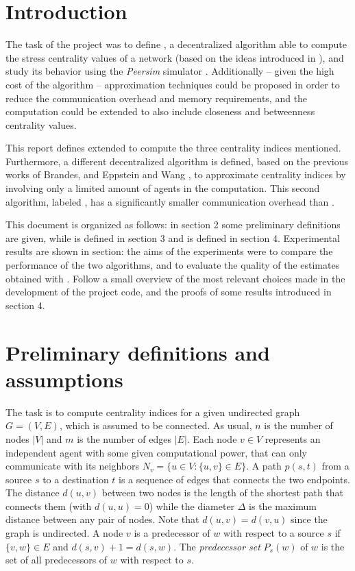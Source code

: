 
\theoremstyle{definition}
\newtheorem*{defcc}{Closeness centrality}
\newtheorem*{defsc}{Stress centrality}
\newtheorem*{defbc}{Betweenness centrality}

\section{Introduction}

The task of the project was to define \deccen{}, a decentralized algorithm able to compute the stress centrality values of a network (based on the ideas introduced in \cite{lehmann2003}), and study its behavior using the \emph{Peersim} simulator \cite{peersim}. Additionally -- given the high cost of the algorithm -- approximation techniques could be proposed in order to reduce the communication overhead and memory requirements, and the computation could be extended to also include closeness and betweenness centrality values.

This report defines \deccen{} extended to compute the three centrality indices mentioned. Furthermore, a different decentralized algorithm is defined, based on the previous works of Brandes, and Eppstein and Wang \cite{brandes2001, ew2004, brandes2007}, to approximate centrality indices by involving only a limited amount of agents in the computation. This second algorithm, labeled \multibfs{}, has a significantly smaller communication overhead than \deccen{}.

This document is organized as follows: in section 2 some preliminary definitions are given, while \deccen{} is defined in section 3 and \multibfs{} is defined in section 4. Experimental results are shown in section: the aims of the experiments were to compare the performance of the two algorithms, and to evaluate the quality of the estimates obtained with \multibfs{}. Follow a small overview of the most relevant choices made in the development of the project code, and the proofs of some results introduced in section 4.


\section{Preliminary definitions and assumptions}

The task is to compute centrality indices for a given undirected graph $G = (V,E)$, which is assumed to be connected. As usual, $n$ is the number of nodes $|V|$ and $m$ is the number of edges $|E|$. Each node $v \in V$ represents an independent agent with some given computational power, that can only communicate with its neighbors $N_v = \{u \in V : \{u,v\} \in E\}$. A path $p(s,t)$ from a source $s$ to a destination $t$ is a sequence of edges that connects the two endpoints. The distance $d(u,v)$ between two nodes is the length of the shortest path that connects them (with $d(u,u) = 0$) while the diameter $\Delta$ is the maximum distance between any pair of nodes. Note that $d(u,v) = d(v,u)$ since the graph is undirected. A node $v$ is a predecessor of $w$ with respect to a source $s$ if $\{v,w\} \in E$ and $d(s,v) +1 = d(s,w)$. The \emph{predecessor set} $P_s(w)$ of $w$ is the set of all predecessors of $w$ with respect to $s$.

